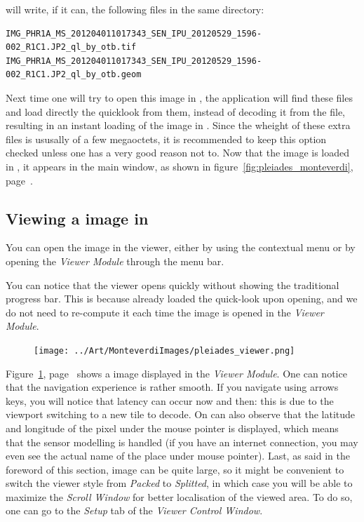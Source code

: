 \mont will write, if it can, the following files in the same
directory:
\begin{scriptsize}
\begin{verbatim}
IMG_PHR1A_MS_201204011017343_SEN_IPU_20120529_1596-002_R1C1.JP2_ql_by_otb.tif
IMG_PHR1A_MS_201204011017343_SEN_IPU_20120529_1596-002_R1C1.JP2_ql_by_otb.geom
\end{verbatim}
\end{scriptsize}

Next time one will try to open this image in \mont, the application
will find these files and load directly the quicklook from them,
instead of decoding it from the \jpg file, resulting in an instant
loading of the image in \mont. Since the wheight of these extra files
is ususally of a few megaoctets, it is recommended to keep this option
checked unless one has a very good reason not to. Now that the \phr
image is loaded in \mont, it appears in the main \mont window, as
shown in figure~\ref{fig:pleiades_monteverdi},
page~\pageref{fig:pleiades_monteverdi}.


\subsection{Viewing a \phr image in \mont}

 You can open the \phr image in the viewer, either by using the
contextual menu or by opening the \textit{Viewer Module} through the
menu bar.

You can notice that the viewer opens quickly without showing the
traditional progress bar. This is because \mont already loaded the
quick-look upon opening, and we do not need to re-compute it each time
the image is opened in the \textit{Viewer Module}. 

\begin{figure}[!t]
  \center
  \texttt{[image: ../Art/MonteverdiImages/pleiades\_viewer.png]}
  \label{fig:pleiades_viewer}
\end{figure}

Figure~\ref{fig:pleiades_viewer}, page~\pageref{fig:pleiades_viewer}
shows a \phr image displayed in the \textit{Viewer Module}. One can
notice that the navigation experience is rather smooth. If you
navigate using arrows keys, you will notice that latency can occur now
and then: this is due to the viewport switching to a new \jpg tile to
decode. On can also observe that the latitude and longitude of the
pixel under the mouse pointer is displayed, which means that the
sensor modelling is handled (if you have an internet connection, you
may even see the actual name of the place under mouse
pointer). Last, as said in the foreword of this section, \phr image
can be quite large, so it might be convenient to switch the viewer
style from \textit{Packed} to \textit{Splitted}, in which case you
will be able to maximize the \textit{Scroll Window} for better
localisation of the viewed area. To do so, one can go to
the \textit{Setup} tab of the \textit{Viewer Control Window}.

